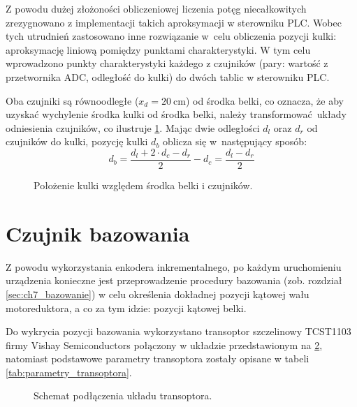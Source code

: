 Z powodu dużej złożoności obliczeniowej liczenia potęg niecałkowitych zrezygnowano z implementacji takich aproksymacji w sterowniku PLC. Wobec tych utrudnień zastosowano inne rozwiązanie w~celu obliczenia pozycji kulki: aproksymację liniową pomiędzy punktami charakterystyki. W tym celu wprowadzono punkty charakterystyki każdego z czujników (pary: wartość z przetwornika ADC, odległość do kulki) do dwóch tablic w sterowniku PLC.

Oba czujniki są równoodległe ($x_d = \SI{20}{\centi\meter}$) od środka belki, co oznacza, że aby uzyskać wychylenie środka kulki od środka belki, należy transformować układy odniesienia czujników, co ilustruje \cref{fig:polozenie_kulki}. Mając dwie odległości $d_l$ oraz $d_r$ od czujników do kulki, pozycję kulki $d_b$ oblicza się w~następujący sposób:
\begin{equation}\label{eq:pozycja_kulki}
d_b = \frac{d_l + 2\cdot d_c - d_r}{2} - d_c = \frac{d_l - d_r}{2}
\end{equation}

\begin{figure}[H]
    \centering
    
    \caption{Położenie kulki względem środka belki i czujników.}
    \label{fig:polozenie_kulki}
\end{figure}


\section{Czujnik bazowania}
\label{sec:ch3_czujnik_bazowania}

Z powodu wykorzystania enkodera inkrementalnego, po każdym uruchomieniu urządzenia konieczne jest przeprowadzenie procedury bazowania (zob. rozdział \ref{sec:ch7_bazowanie}) w celu określenia dokładnej pozycji kątowej wału motoreduktora, a co za tym idzie: pozycji kątowej belki.

Do wykrycia pozycji bazowania wykorzystano transoptor szczelinowy TCST1103 firmy Vishay Semiconductors połączony w układzie przedstawionym na \cref{fig:uklad_transoptora}, natomiast podstawowe parametry transoptora zostały opisane w tabeli \ref{tab:parametry_transoptora}.

\begin{figure}[H]
    \centering
    
    \caption{Schemat podłączenia układu transoptora.}
    \label{fig:uklad_transoptora}
\end{figure}

